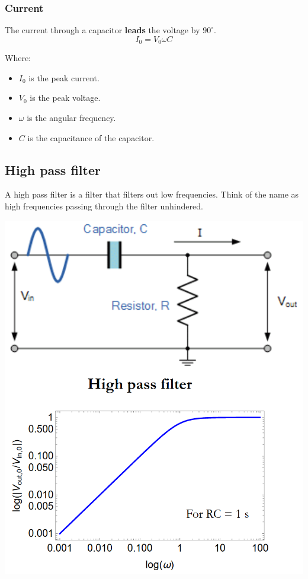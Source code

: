 \documentclass[11pt]{article}
\begin{document}
\subsubsection{Current}
\label{sec:org082cb14}
The current through a capacitor \textbf{leads} the voltage by \(90^{\circ}\).
\[I_0 = V_0 \omega C\]

Where:
\begin{itemize}
\item \(I_0\) is the peak current.
\item \(V_0\) is the peak voltage.
\item \(\omega\) is the angular frequency.
\item \(C\) is the capacitance of the capacitor.
\end{itemize}


\subsection{High pass filter}
\label{sec:org025e516}
A high pass filter is a filter that filters out low frequencies. Think of the name as high frequencies passing through the filter unhindered.

\begin{center}
\includegraphics[scale=0.69]{./images/high-pass-filter.png}
\end{center}
\end{document}
